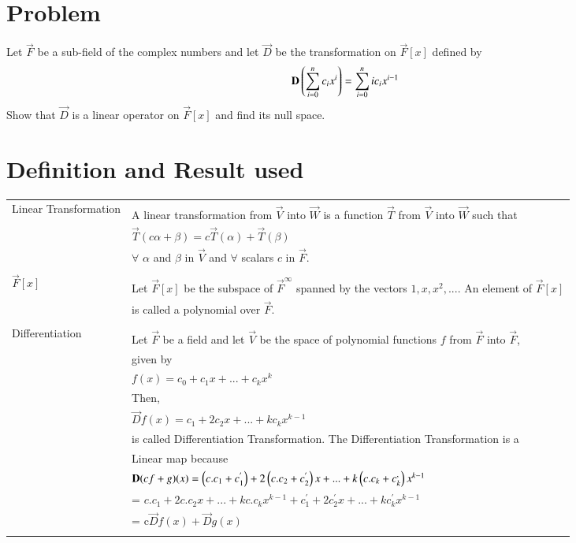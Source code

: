 \documentclass[journal,12pt,twocolumn]{IEEEtran}
\newcommand\myemptypage{
	\null
	\thispagestyle{empty}
	\addtocounter{page}{-1}
	\newpage
}
\begin{document}
\section{Problem}
Let $\vec{F}$ be a sub-field of the complex numbers and let $\vec{D}$ be the transformation on $\vec{F}[x]$ defined by
\begin{align}
\mathbf{D}\left(\sum_{i=0}^{n}c_ix^{i}\right) = \sum_{i=0}^{n}ic_ix^{i-1} \label{1}
\end{align}
Show that $\vec{D}$ is a linear operator on $\vec{F}[x]$ and find its null space.
\section{Definition and Result used}
\begin{table}[hp]
	\begin{tabular}{|l|l|}
	\hline
	\multirow{3}{*}{Linear Transformation} & \\
	& A linear transformation from $\vec{V}$ into $\vec{W}$ is a function $\vec{T}$ from $\vec{V}$ into $\vec{W}$ such that \\
	& \qquad \qquad \qquad \qquad \qquad $\vec{T}(c\alpha + \beta) = c\vec{T}(\alpha) + \vec{T}(\beta)$  \\
	& $\forall$ $\alpha$ and $\beta$ in $\vec{V}$ and $\forall$ scalars $c$ in $\vec{F}$. \\
	& \\
	\hline
	\multirow{3}{*}{\qquad \qquad $\vec{F}[x]$} & \\
	& Let $\vec{F}[x]$ be the subspace of $\vec{F}^{\infty}$ spanned by the vectors $1, x, x^2,...$. An element of $\vec{F}[x]$ \\
	& is called a polynomial over $\vec{F}$. \\
	& \\
	\hline
	\multirow{3}{*}{\qquad Differentiation} & \\
	& Let $\vec{F}$ be a field and let $\vec{V}$ be the space of polynomial functions $f$ from $\vec{F}$ into $\vec{F}$,\\
\qquad Transformation & given by \\
    & \qquad \qquad \qquad  $f(x) = c_0 + c_1x + . . . + c_kx^k$\\  
    & Then,\\
    &\qquad \qquad \qquad $\vec{D}f(x) = c_1 + 2c_2x + ...+ kc_kx^{k-1} $\\
    & is called Differentiation Transformation. The Differentiation Transformation is a \\
	& Linear map because \\
	& \qquad \qquad \qquad $\mathbf{D}(cf+g)(x) = \left(c.c_1 + c_1^{'}\right) + 2\left(c.c_2 + c_2^{'}\right)x + ... + k\left(c.c_k + c_k^{,}\right)x^{k-1}$ \\
    & \qquad \qquad \qquad \qquad \qquad \qquad = $c.c_1 + 2c.c_2x + ... + kc.c_kx^{k-1} + c_1^{'} + 2c_2^{'}x + ... + kc_k^{'}x^{k-1}$ \\	
    & \qquad \qquad \qquad \qquad \qquad \qquad = c$\vec{D}f(x) + \vec{D}g(x)$\\
    &\\
    \hline
\end{tabular}
\end{table}
\pagebreak
\myemptypage
\end{document}
